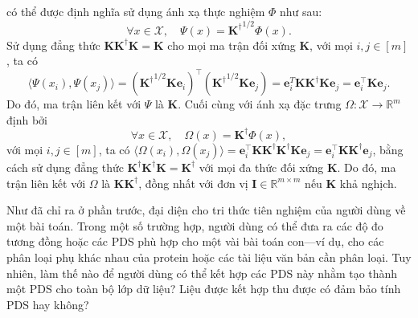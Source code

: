 có thể được định nghĩa sử dụng ánh xạ  thực nghiệm $\Phi$ như sau:
\begin{equation}
  \forall x \in \mathcal{X}, \quad \Psi(x) = {\mathbf{K}^\dag}^{1/2}\Phi(x).
\end{equation} Sử dụng đẳng thức $\mathbf{K}\mathbf{K}^\dag\mathbf{K} =
\mathbf{K}$ cho mọi ma trận đối xứng $\mathbf{K}$, với mọi $i, j\in [m]$, ta có
\begin{equation}
  \bigl\langle \Psi(x_i), \Psi(x_j) \bigr\rangle =
  ({\mathbf{K}^\dag}^{1/2} \mathbf{K} \mathbf{e}_i)^\intercal
  ({\mathbf{K}^\dag}^{1/2} \mathbf{K} \mathbf{e}_j) = \mathbf{e}_i^T
  \mathbf{K} \mathbf{K}^\dag \mathbf{K} \mathbf{e}_j = \mathbf{e}_i^\intercal
  \mathbf{K} \mathbf{e}_j.
\end{equation} Do đó, ma trận  liên kết với $\Psi$ là $\mathbf{K}$.
Cuối cùng với ánh xạ đặc trưng $\Omega \colon \mathcal{X} \to \mathbb{R}^m$
định bởi \begin{equation}
  \forall x \in \mathcal{X}, \quad \Omega(x) = \mathbf{K}^\dag \Phi(x),
\end{equation} với mọi $i, j \in [m]$, ta có $\bigl\langle \Omega(x_i),
\Omega(x_j) \bigr\rangle = \mathbf{e}_i^\intercal \mathbf{K} \mathbf{K}^\dag
\mathbf{K}^\dag \mathbf{K} \mathbf{e}_j = \mathbf{e}_i^\intercal \mathbf{K}
\mathbf{K}^\dag \mathbf{e}_j$, bằng cách sử dụng đẳng thức $\mathbf{K}^\dag
\mathbf{K}^\dag \mathbf{K} = \mathbf{K}^\dag$ với mọi đa thức đối xứng
$\mathbf{K}$. Do đó, ma trận  liên kết với $\Omega$ là $\mathbf{K}
\mathbf{K}^\dag$, đồng nhất với  đơn vị $\mathbf{I} \in
\mathbb{R}^{m\times m}$ nếu $\mathbf{K}$ khả nghịch.

Như đã chỉ ra ở phần trước,  đại diện cho tri thức tiên nghiệm của
người dùng về một bài toán. Trong một số trường hợp, người dùng có thể đưa ra
các độ đo tương đồng hoặc các  PDS phù hợp cho một vài bài toán
con---ví dụ, cho các phân loại phụ khác nhau của protein hoặc các tài liệu văn
bản cần phân loại. Tuy nhiên, làm thế nào để người dùng có thể kết hợp các
 PDS này nhằm tạo thành một  PDS cho toàn bộ lớp dữ liệu?
Liệu  được kết hợp thu được có đảm bảo tính PDS hay không?

